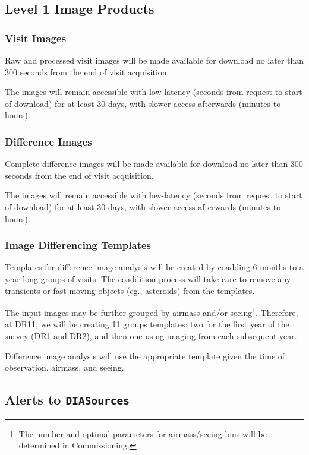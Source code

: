 \documentclass[12pt]{article}
\newcommand{\code}[1]{\texttt{#1}}
\newcommand{\DIASources}{\code{DIASources}\xspace}
\begin{document}
\subsection{Level 1 Image Products}

\subsubsection{Visit Images}

Raw and processed visit images will be made available for download no later than 300 seconds from the end of visit acquisition.

The images will remain accessible with low-latency (seconds from request to start of download) for at least 30 days, with slower access afterwards (minutes to hours).

\subsubsection{Difference Images}
\label{sec:diffims}

Complete difference images will be made available for download no later than 300 seconds from the end of visit acquisition.

The images will remain accessible with low-latency (seconds from request to start of download) for at least 30 days, with slower access afterwards (minutes to hours).

\subsubsection{Image Differencing Templates}
\label{sec:templates}

Templates for difference image analysis will be created by coadding 6-months to a year long groups of visits. The coaddition process will take care to remove any transients or fast moving objects (eg., asteroids) from the templates.

The input images may be further grouped by airmass and/or seeing\footnote{The number and optimal parameters for airmass/seeing bins will be determined in Commissioning.}. Therefore, at DR11, we will be creating 11 groups templates: two for the first year of the survey (DR1 and DR2), and then one using imaging from each subsequent year.

Difference image analysis will use the appropriate template given the time of observation, airmass, and seeing.

\subsection{Alerts to \DIASources}
\label{sec:voEventContents}
\end{document}
